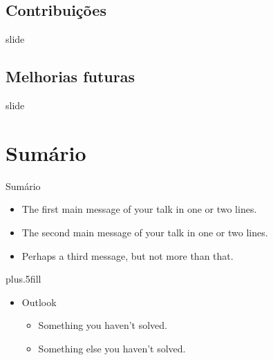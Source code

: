 \documentclass[ucs,8pt]{beamer}
\begin{document}
\subsection{Contribuições}
\begin{frame}{slide}


\end{frame}



\subsection{Melhorias futuras}
\begin{frame}{slide}


\end{frame}




\section*{Sumário}

\begin{frame}{Sumário}

  \begin{itemize}
  \item
    The \alert{first main message} of your talk in one or two lines.
  \item
    The \alert{second main message} of your talk in one or two lines.
  \item
    Perhaps a \alert{third message}, but not more than that.
  \end{itemize}
  
  \vskip0pt plus.5fill
  \begin{itemize}
  \item
    Outlook
    \begin{itemize}
    \item
      Something you haven't solved.
    \item
      Something else you haven't solved.
    \end{itemize}
  \end{itemize}
\end{frame}
\end{document}

